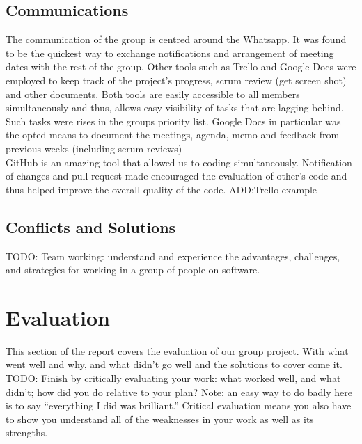 \documentclass{article}[11pt,Tahoma]
\begin{document}
		\subsection{Communications}
			The communication of the group is centred around the Whatsapp. It was found to be the quickest way to exchange notifications and arrangement of meeting dates with the rest of the group. Other tools such as Trello and Google Docs were employed to keep track of the project's progress, scrum review (get screen shot) and other documents. Both tools are easily accessible to all members simultaneously and thus, allows easy visibility of tasks that are lagging behind. Such tasks were rises in the groups priority list. Google Docs in particular was the opted means to document the meetings, agenda, memo and feedback from previous weeks (including scrum reviews)\\
				GitHub is an amazing tool that allowed us to coding simultaneously. Notification of changes and pull request made encouraged the evaluation of other's code and thus helped improve the overall quality of the code.
				ADD:Trello example
		\subsection{Conflicts and Solutions}
		TODO: Team working: understand and experience the advantages, challenges, and strategies for working in a group of people on software.
	\section{Evaluation}
		This section of the report covers the evaluation of our group project.  With what went well and why, and what didn't go well and the solutions to cover come it.
		\underline{TODO:}
		Finish by critically evaluating your work: what worked well, and what didn’t; how did you do relative to your plan? Note: an easy way to do badly here is to say “everything I did was brilliant.” Critical evaluation means you also have to show you understand all of the weaknesses in your work as well as its strengths.
\end{document}
